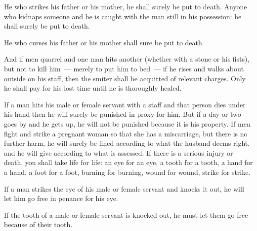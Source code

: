 \begin{inparaenum}
   He who strikes his father or his mother, he shall surely be put to death.%
   Anyone who kidnaps someone and he is caught with the man still in his possession: he shall surely be put to death.%
  
   He who curses his father or his mother shall sure be put to death.%
  
   And if men quarrel and one man hits another (whether with a stone or his fists), but not to kill him~--- merely to put him to bed~---%
   if he rises and walks about outside on his staff, then the smiter shall be acquitted of relevant charges. Only he shall pay for his lost time until he is thoroughly healed.%
  
   If a man hits his male or female servant with a staff and that person dies under his hand then he will surely be punished in proxy for him.%
   But if a day or two goes by and he gets up, he will not be punished because it is his property.%
   If men fight and strike a pregnant woman so that she has a miscarriage, but there is no further harm, he will surely be fined according to what the husband deems right, and he will give according to what is assessed.%
   If there is a serious injury or death, you shall take life for life:%
   an eye for an eye, a tooth for a tooth, a hand for a hand, a foot for a foot,%
   burning for burning, wound for wound, strike for strike.%
  
   If a man strikes the eye of his male or female servant and knocks it out, he will let him go free in penance for his eye.%
  
   If the tooth of a male or female servant is knocked out, he must let them go free because of their tooth.%
  

\end{inparaenum}
